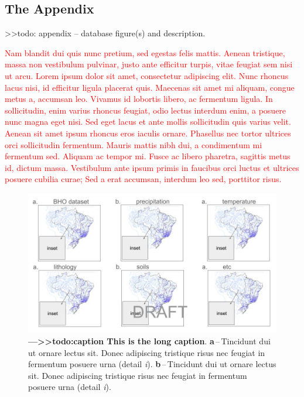 \documentclass[12pt]{article}
\begin{document}
	
\clearpage
\begin{appendices}
	
\section{The Appendix} \label{ap:first}

\par >>todo: appendix -- database figure(s) and description.

\par \textcolor{red}{Nam blandit dui quis nunc pretium, sed egestas felis mattis. Aenean tristique, massa non vestibulum pulvinar, justo ante efficitur turpis, vitae feugiat sem nisi ut arcu. Lorem ipsum dolor sit amet, consectetur adipiscing elit. Nunc rhoncus lacus nisi, id efficitur ligula placerat quis. Maecenas sit amet mi aliquam, congue metus a, accumsan leo. Vivamus id lobortis libero, ac fermentum ligula. In sollicitudin, enim varius rhoncus feugiat, odio lectus interdum enim, a posuere nunc magna eget nisi. Sed eget lacus et ante mollis sollicitudin quis varius velit. Aenean sit amet ipsum rhoncus eros iaculis ornare. Phasellus nec tortor ultrices orci sollicitudin fermentum. Mauris mattis nibh dui, a condimentum mi fermentum sed. Aliquam ac tempor mi. Fusce ac libero pharetra, sagittis metus id, dictum massa. Vestibulum ante ipsum primis in faucibus orci luctus et ultrices posuere cubilia curae; Sed a erat accumsan, interdum leo sed, porttitor risus.}

\begin{figure}[t!] %
	\centering                                       
	\includegraphics[width=0.98\linewidth]{figs/pre_descrip.jpg}    
	\caption[>>:todo:caption Short caption]
	{ \textbf{---\;>>todo:caption This is the long caption}.
		\textbf{a}\,--\,Tincidunt dui ut ornare lectus sit. Donec adipiscing tristique risus nec feugiat in fermentum posuere urna (detail \textrm{\textit{i}}).
		\textbf{b}\,--\,Tincidunt dui ut ornare lectus sit. Donec adipiscing tristique risus nec feugiat in fermentum posuere urna (detail \textrm{\textit{i}}).		
	}
	\label{fig:descript}  %
\end{figure}


\clearpage

\end{appendices}
\clearpage
\singlespacing
\printbibliography
\end{document}
